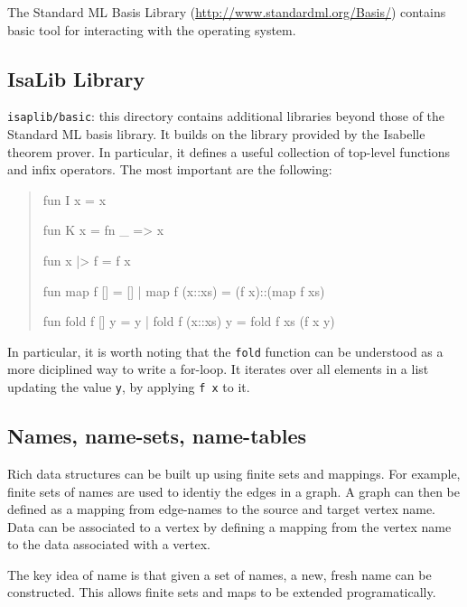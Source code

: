 \documentclass{article}
\newenvironment{graybox}
  {\def\FrameCommand{\fboxsep=0pt\colorbox{gray!20}}\MakeFramed{\smallskip\FrameRestore}\begin{quote}}
  {\end{quote}\smallskip\endMakeFramed}
\newenvironment{code}
  {\begin{graybox}\begin{allmtt}}
  {\end{allmtt}\end{graybox}}
\begin{document}
The Standard ML Basis Library (\url{http://www.standardml.org/Basis/})
contains basic tool for interacting with the operating system.

\subsection{IsaLib Library}

{\tt isaplib/basic}: this directory contains additional libraries
beyond those of the Standard ML basis library. It builds on the
library provided by the Isabelle theorem prover. In particular, it
defines a useful collection of top-level functions and infix
operators. The most important are the following:

\begin{code}
fun I x = x

fun K x = fn \_ => x

fun x |> f = f x

fun map f [] = []
  | map f (x::xs) = (f x)::(map f xs)

fun fold f [] y = y
  | fold f (x::xs) y = fold f xs (f x y)
\end{code}

In particular, it is worth noting that the {\tt fold} function can be
understood as a more diciplined way to write a for-loop. It iterates
over all elements in a list updating the value {\tt y}, by applying
{\tt f x} to it.

\subsection{Names, name-sets, name-tables}

Rich data structures can be built up using finite sets and
mappings. For example, finite sets of names are used to identiy the
edges in a graph. A graph can then be defined as a mapping from
edge-names to the source and target vertex name. Data can be
associated to a vertex by defining a mapping from the vertex name to
the data associated with a vertex.

The key idea of name is that given a set of names, a new, fresh name
can be constructed. This allows finite sets and maps to be extended
programatically.


\end{document}
